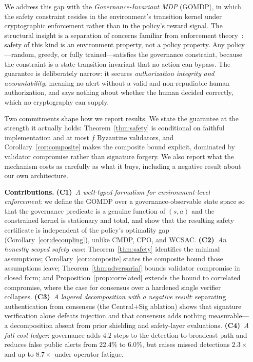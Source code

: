 \documentclass[letterpaper]{article} %
\begin{document}
We address this gap with the \emph{Governance-Invariant MDP} (GOMDP), in which the safety constraint resides in the environment's transition kernel under cryptographic enforcement rather than in the policy's reward signal. The structural insight is a separation of concerns familiar from enforcement theory~\citep{schneider2000,ligatti2005}: safety of this kind is an environment property, not a policy property. Any policy---random, greedy, or fully trained---satisfies the governance constraint, because the constraint is a state-transition invariant that no action can bypass. The guarantee is deliberately narrow: it secures \emph{authorization integrity and accountability}, meaning no alert without a valid and non-repudiable human authorization, and says nothing about whether the human decided correctly, which no cryptography can supply.

Two commitments shape how we report results. We state the guarantee at the strength it actually holds: Theorem~\ref{thm:safety} is conditional on faithful implementation and at most $f$ Byzantine validators, and Corollary~\ref{cor:composite} makes the composite bound explicit, dominated by validator compromise rather than signature forgery. We also report what the mechanism costs as carefully as what it buys, including a negative result about our own architecture.

\noindent\textbf{Contributions.} \textbf{(C1)}~\emph{A well-typed formalism for environment-level enforcement}: we define the GOMDP over a governance-observable state space so that the governance predicate is a genuine function of $(s,a)$ and the constrained kernel is stationary and total, and show that the resulting safety certificate is independent of the policy's optimality gap (Corollary~\ref{cor:decoupling}), unlike CMDP, CPO, and WCSAC. \textbf{(C2)}~\emph{An honestly scoped safety case}: Theorem~\ref{thm:safety} identifies the minimal assumptions; Corollary~\ref{cor:composite} states the composite bound those assumptions leave; Theorem~\ref{thm:adversarial} bounds validator compromise in closed form; and Proposition~\ref{prop:correlated} extends the bound to correlated compromise, where the case for consensus over a hardened single verifier collapses. \textbf{(C3)}~\emph{A layered decomposition with a negative result}: separating authentication from consensus (the Central+Sig ablation) shows that signature verification alone defeats injection and that consensus adds nothing measurable---a decomposition absent from prior shielding and safety-layer evaluations. \textbf{(C4)}~\emph{A full cost ledger}: governance adds $4.2$ steps to the detection-to-broadcast path and reduces false public alerts from 22.4\% to 6.0\%, but raises missed detections $2.3\times$ and up to $8.7\times$ under operator fatigue.
\end{document}
